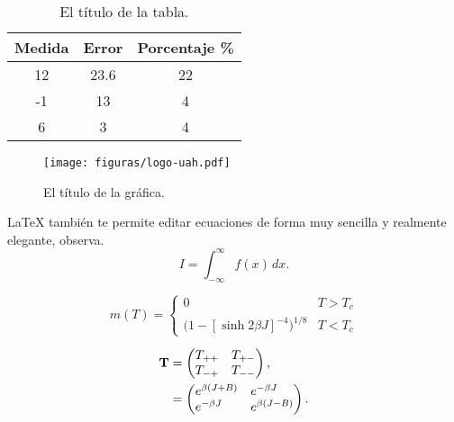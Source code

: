 \begin{table}
\begin{center}
\begin{tabular}{|c|c|c|}\hline
\textbf{Medida} & \textbf{Error} & \textbf{Porcentaje} \% \\ \hline
12 & 23.6 & 22 \\ \hline
-1 & 13 & 4 \\ \hline
6 & 3 & 4 \\ \hline
\end{tabular}
\caption[El título corto de la tabla.]{El título de la tabla.}
\label{tabla:primera}
\end{center}
\end{table}

\begin{figure}
\begin{center}
\texttt{[image: figuras/logo-uah.pdf]}\\
\end{center}
\caption[El título corto de la gráfica.]{El título de la gráfica.}
\label{grafico:primero}
\end{figure}


\LaTeX{} también te permite editar ecuaciones de forma muy sencilla y realmente elegante, observa.
\begin{equation}
I = \! \int_{-\infty}^\infty f(x)\,dx \label{eq:fine}.
\end{equation}

\begin{equation}
\label{eq:mdiv}
m(T) =
\begin{cases}
0 & \text{$T > T_c$} \\
\bigl(1 - [\sinh 2 \beta J]^{-4} \bigr)^{\! 1/8} & \text{$T < T_c$}
\end{cases}
\end{equation}

\begin{align}
\textbf{T} &=
\begin{pmatrix}
T_{++} \hfill & T_{+-} \\
T_{-+} & T_{--} \hfill 
\end{pmatrix} , \nonumber \\
& =
\begin{pmatrix}
e^{\beta (J + B)} \hfill & e^{-\beta J} \hfill \\
e^{-\beta J} \hfill & e^{\beta (J - B)} \hfill
\end{pmatrix}.
\end{align}

